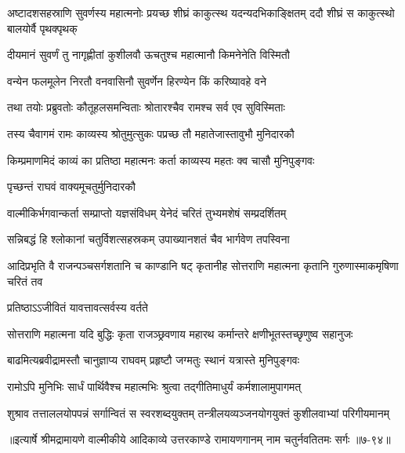 \threelineshloka
{अष्टादशसहस्राणि सुवर्णस्य महात्मनोः}
{प्रयच्छ शीघ्रं काकुत्स्थ यदन्यदभिकाङ्क्षितम्}
{ददौ शीघ्रं स काकुत्स्थो बालयोर्वै पृथक्पृथक्} %

\twolineshloka
{दीयमानं सुवर्णं तु नागृह्णीतां कुशीलवौ}
{ऊचतुश्च महात्मानौ किमनेनेति विस्मितौ} %

\twolineshloka
{वन्येन फलमूलेन निरतौ वनवासिनौ}
{सुवर्णेन हिरण्येन किं करिष्यावहे वने} %

\twolineshloka
{तथा तयोः प्रब्रुवतोः कौतूहलसमन्विताः}
{श्रोतारश्चैव रामश्च सर्व एव सुविस्मिताः} %

\twolineshloka
{तस्य चैवागमं रामः काव्यस्य श्रोतुमुत्सुकः}
{पप्रच्छ तौ महातेजास्तावुभौ मुनिदारकौ} %

\twolineshloka
{किम्प्रमाणमिदं काव्यं का प्रतिष्ठा महात्मनः}
{कर्ता काव्यस्य महतः क्व चासौ मुनिपुङ्गवः} %

\onelineshloka
{पृच्छन्तं राघवं वाक्यमूचतुर्मुनिदारकौ} %

\twolineshloka
{वाल्मीकिर्भगवान्कर्ता सम्प्राप्तो यज्ञसंविधम्}
{येनेदं चरितं तुभ्यमशेषं सम्प्रदर्शितम्} %

\twolineshloka
{सन्निबद्धं हि श्लोकानां चतुर्विशत्सहस्रकम्}
{उपाख्यानशतं चैव भार्गवेण तपस्विना} %

\threelineshloka
{आदिप्रभृति वै राजन्पञ्चसर्गशतानि च}
{काण्डानि षट् कृतानीह सोत्तराणि महात्मना}
{कृतानि गुरुणास्माकमृषिणा चरितं तव} %

\onelineshloka
{प्रतिष्ठाऽऽजीवितं यावत्तावत्सर्वस्य वर्तते} %

\threelineshloka
{सोत्तराणि महात्मना}
{यदि बुद्धिः कृता राजञ्छ्रवणाय महारथ}
{कर्मान्तरे क्षणीभूतस्तच्छृणुष्व सहानुजः} %

\twolineshloka
{बाढमित्यब्रवीद्रामस्तौ चानुज्ञाप्य राघवम्}
{प्रहृष्टौ जग्मतुः स्थानं यत्रास्ते मुनिपुङ्गवः} %

\twolineshloka
{रामोऽपि मुनिभिः सार्धं पार्थिवैश्च महात्मभिः}
{श्रुत्वा तद्गीतिमाधुर्यं कर्मशालामुपागमत्} %

\twolineshloka
{शुश्राव तत्ताललयोपपन्नं सर्गान्वितं स स्वरशब्दयुक्तम्}
{तन्त्रीलयव्यञ्जनयोगयुक्तं कुशीलवाभ्यां परिगीयमानम्} %


॥इत्यार्षे श्रीमद्रामायणे वाल्मीकीये आदिकाव्ये उत्तरकाण्डे रामायणगानम् नाम चतुर्नवतितमः सर्गः ॥७-९४॥
